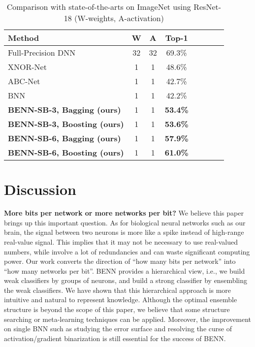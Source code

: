 \documentclass[10pt,twocolumn,letterpaper]{article}
\begin{document}
\begin{table}
    \vspace{-3mm}
        \caption{Comparison with state-of-the-arts on ImageNet using ResNet-18 (W-weights, A-activation)}
        \centering
        \scriptsize
        \begin{tabular}{lccccccr}
            \toprule
            \toprule
            Method & W & A & Top-1\\
            \midrule
            \multirow{1}{3.5cm}{Full-Precision DNN \cite{he2016deep, lin2017towards}} & 32 & 32 &  69.3\% \\
            \hline
            \multirow{1}{3.5cm}{XNOR-Net \cite{rastegari2016xnor}}  & 1 & 1 & 48.6\%\\
            \hline
            \multirow{1}{3.5cm}{ABC-Net \cite{lin2017towards}}  & 1 & 1 & 42.7\%\\
            \hline
            \multirow{1}{3.5cm}{BNN \cite{hubara2016binarized, rastegari2016xnor}} & 1 & 1 & 42.2\% \\
            \hline
            \multirow{1}{3.5cm}{\textbf{BENN-SB-3, Bagging (ours)}} & 1 & 1 & \textbf{53.4\%} \\
            \hline
            \multirow{1}{3.5cm}{\textbf{BENN-SB-3, Boosting (ours)}} & 1 & 1 & \textbf{53.6\%} \\
            \hline
            \multirow{1}{3.5cm}{\textbf{BENN-SB-6, Bagging (ours)}} & 1 & 1 & \textbf{57.9\%} \\
            \hline
            \multirow{1}{3.5cm}{\textbf{BENN-SB-6, Boosting (ours)}} & 1 & 1 & \textbf{61.0\%} \\
            \hline
            \bottomrule
        \end{tabular}
        \label{table:resnet}
        \vspace{-5mm}
\end{table}

\section{Discussion}
\label{sec:discussion}
\textbf{More bits per network or more networks per bit? } We believe this paper brings up this important question. As for biological neural networks such as our brain, the signal between two neurons is more like a spike instead of high-range real-value signal. This implies that it may not be necessary to use real-valued numbers, while involve a lot of redundancies and can waste significant computing power. Our work converts the direction of ``how many bits per network'' into ``how many networks per bit''. BENN provides a hierarchical view, i.e., we build weak classifiers by  groups of neurons, and build a strong classifier by ensembling the weak classifiers. We have shown that this hierarchical approach is more intuitive and natural to represent knowledge. Although the optimal ensemble structure is beyond the scope of this paper, we believe that some structure searching or meta-learning techniques can be applied. Moreover, the improvement on single BNN such as studying the error surface and resolving the curse of activation/gradient binarization is still essential for the success of BENN.
\end{document}

